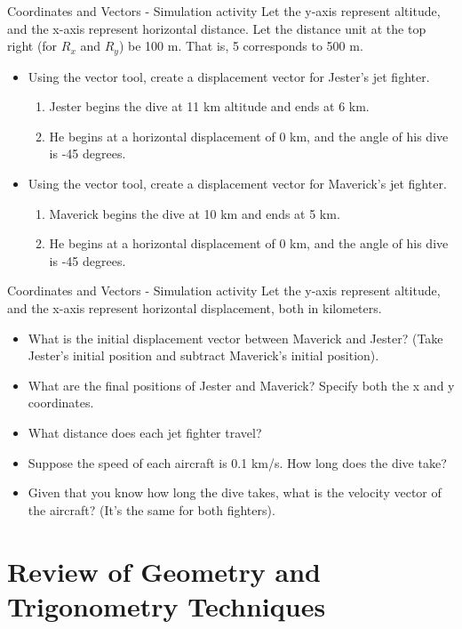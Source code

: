 \documentclass{beamer}
\begin{document}
\begin{frame}{Coordinates and Vectors - Simulation activity}
\small
Let the y-axis represent altitude, and the x-axis represent horizontal distance.  Let the distance unit at the top right (for $R_x$ and $R_y$) be 100 m.  That is, 5 corresponds to 500 m.
\begin{itemize}
\item Using the vector tool, create a displacement vector for Jester's jet fighter.
\begin{enumerate}
\item Jester begins the dive at 11 km altitude and ends at 6 km.
\item He begins at a horizontal displacement of 0 km, and the angle of his dive is -45 degrees.
\end{enumerate}
\item Using the vector tool, create a displacement vector for Maverick's jet fighter.
\begin{enumerate}
\item Maverick begins the dive at 10 km and ends at 5 km.
\item He begins at a horizontal displacement of 0 km, and the angle of his dive is -45 degrees.
\end{enumerate}
\end{itemize}
\end{frame}

\begin{frame}{Coordinates and Vectors - Simulation activity}
\small
Let the y-axis represent altitude, and the x-axis represent horizontal displacement, both in kilometers.
\begin{itemize}
\item What is the initial displacement vector between Maverick and Jester? (Take Jester's initial position and subtract Maverick's initial position).
\item What are the final positions of Jester and Maverick?  Specify both the x and y coordinates.
\item What distance does each jet fighter travel?
\item Suppose the speed of each aircraft is 0.1 km/s.  How long does the dive take?
\item Given that you know how long the dive takes, what is the velocity vector of the aircraft?  (It's the same for both fighters).
\end{itemize}
\end{frame}

\section{Review of Geometry and Trigonometry Techniques}
\end{document}

